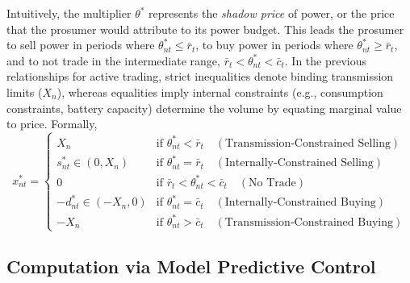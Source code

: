 \documentclass[12pt, notitlepage]{article}
\begin{document}
Intuitively, the multiplier $\theta^*$ represents the \textit{shadow price} of power, or the price that the prosumer would attribute to its power budget. This leads the prosumer to sell power in periods where $\theta^*_{nt} \leq \bar{r}_t$, to buy power in periods where  $\theta^*_{nt} \geq \bar{r}_t$, and to not trade in the intermediate range, $\bar{r}_t < \theta_{nt}^* < \bar{c}_t $.
In the previous relationships for active trading, strict inequalities denote binding transmission limits ($X_n$), whereas equalities imply internal constraints (e.g., consumption constraints, battery capacity) determine the volume by equating marginal value to price. Formally, 
\begin{equation}
x_{nt}^* =
\begin{cases}
    X_n & \text{if } \theta_{nt}^* < \bar{r}_t \quad (\text{Transmission-Constrained Selling}) \\
    s_{nt}^* \in (0, X_n) & \text{if } \theta_{nt}^* = \bar{r}_t \quad (\text{Internally-Constrained Selling}) \\
    0 & \text{if } \bar{r}_t < \theta_{nt}^* < \bar{c}_t \quad (\text{No Trade}) \\
    -d_{nt}^* \in (-X_n, 0) & \text{if } \theta_{nt}^* = \bar{c}_t \quad (\text{Internally-Constrained Buying}) \\
    -X_n & \text{if } \theta_{nt}^* > \bar{c}_t \quad (\text{Transmission-Constrained Buying})
\end{cases}
\label{eq:trading_rule_detailed}
\end{equation}


\subsection{Computation via Model Predictive Control}
\end{document}
